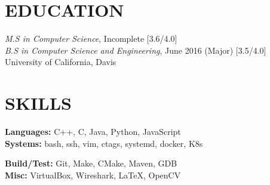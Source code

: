 \documentclass[letterpaper, 10pt, centered]{res} %
\begin{document}
\begin{resume}
\section{EDUCATION}
\textsl{M.S in Computer Science}, Incomplete  \hfill [3.6/4.0]  \\
\textsl{B.S in Computer Science and Engineering}, June 2016 \hfill (Major) [3.5/4.0]  \\
University of California, Davis
\vspace{-6pt}

\section{SKILLS}
\vspace{0pt}
\begin{multicols}{2}
	\textbf{Languages:} C++, C, Java, Python, JavaScript \\
	\textbf{Systems:} bash, ssh, vim, ctags, systemd, docker, K8s \\
	
	\columnbreak
	
	\textbf{Build/Test:} Git, Make, CMake, Maven, GDB \\
	\textbf{Misc:} VirtualBox, Wireshark, LaTeX, OpenCV \\
\end{multicols}

\end{resume}
\end{document}
